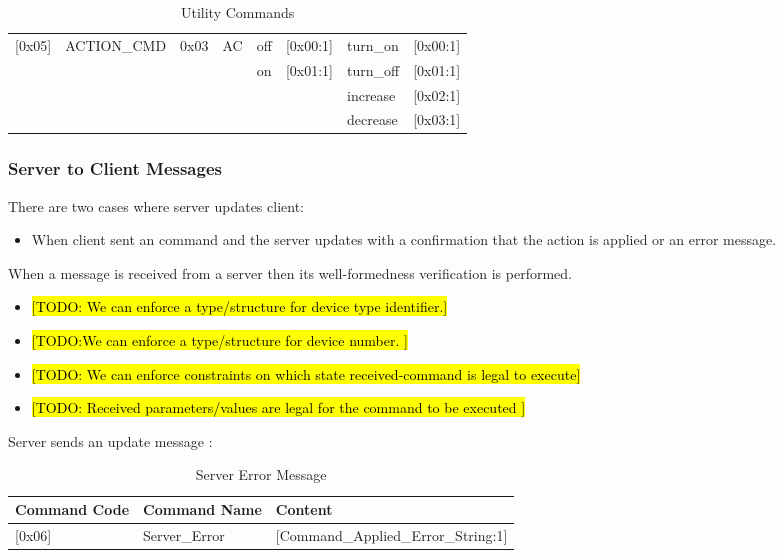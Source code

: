 \begin{table}[ht!]
{\begin{tabular}{l l l l l l l l}
\hline
\textsf{[0x05]} & \textsf{ACTION\_CMD}    &     \textsf{0x03}  & \textsf{AC}         &\textsf{off}      & \textsf{[0x00:1]}   & \textsf{turn\_on} & \textsf{[0x00:1]}  \\
                &                         &                    &                     &\textsf{on}       & \textsf{[0x01:1]}   & \textsf{turn\_off}  & \textsf{[0x01:1]} \\
                &                         &                    &                     &                  &                     & \textsf{increase}    & \textsf{[0x02:1]} \\
                &                         &                    &                     &                  &                     & \textsf{decrease}  & \textsf{[0x03:1]} \\
\hline
\hline
\end{tabular}}
\caption{Utility Commands}
\end{table}


\subsubsection{Server to Client Messages}
\label{sec:pdus:pdu:s_to_c}
There are two cases where server updates client:
\begin{itemize}
\item When client sent an command and the server updates with a confirmation that the action is applied or an error message.
  \end{itemize}

When a message is received from a server then its well-formedness verification is performed.
\begin{itemize}
\item \hl{[TODO: We can enforce a type/structure for device type identifier.]}
\item \hl{[TODO:We can enforce a type/structure for device number. ]}
\item \hl{[TODO: We can enforce constraints on which state received-command is legal to execute]}
  \item \hl{[TODO: Received parameters/values are legal for the command to be executed ]}
\end{itemize}

Server sends an update message :

\begin{table}[ht!]
  \centering
\begin{tabular}{l l l}
\hline
\textbf{Command Code} & \textbf{Command Name} & \textbf{Content}\\
\hline
\hline
\textsf{[0x06]} & \textsf{Server\_Error}  &     \textsf{[Command\_Applied\_Error\_String:1]} \\
\hline
\hline
\end{tabular}
\caption{Server Error Message}
\end{table}


